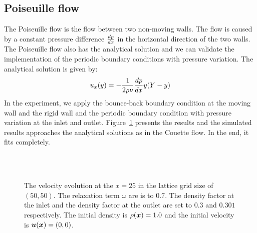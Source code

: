 \subsection{Poiseuille flow}
The Poiseuille flow is the flow between two non-moving walls.
The flow is caused by a constant pressure difference $\frac{d p}{d x}$
in the horizontal direction of the two walls.
The Poiseuille flow also has the analytical solution
and we can validate the implementation of the periodic boundary conditions
with pressure variation.
The analytical solution is given by:
\begin{equation}
\begin{aligned}
  u_x(y) = - \frac{1}{2\rho \nu} \frac{d p}{d x} y (Y - y)
\end{aligned}
\end{equation}
In the experiment, we apply the bounce-back boundary condition
at the moving wall and the rigid wall
and the periodic boundary condition with pressure variation at the inlet and outlet.
Figure~\ref{fig:poiseuille-velocity-evolution} presents the results
and the simulated results approaches the analytical solutions as in the Couette flow.
In the end, it fits completely.

\begin{figure}[tb]
  \begin{center}
    \\
    \\
    \caption{The velocity evolution at
      the $x = 25$ in the lattice grid size of $(50, 50)$.
      The relaxation term $\omega$ are is
      to $0.7$.
      The density factor at the inlet and the density factor
      at the outlet are set to $0.3$ and $0.301$ respectively.
      The initial density is $\rho(\boldsymbol{x}) = 1.0$ and the initial velocity is $\boldsymbol{u}(\boldsymbol{x}) = (0, 0)$.
      \label{fig:poiseuille-velocity-evolution}}
  \end{center}
\end{figure}

